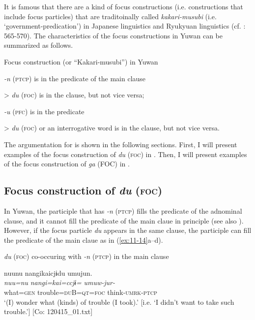 It is famous that there are a kind of focus constructions (i.e. constructions that include focus particles) that are traditoinally called \textit{kakari-musubi} (i.e. ‘government-predication’) in Japanese linguistics and Ryukyuan linguistics (cf. \citealt{Shimoji2008}: 565-570). The characteristics of the focus constructions in Yuwan can be summarized as follows.

\ea\label{ex:11-14}   Focus construction (or “Kakari-musubi”) in Yuwan

\ea   \textit{{}-n} (\textsc{ptcp}) is in the predicate of the main clause

> \textit{du} (\textsc{foc}) is in the clause, but not vice versa;

\ex   \textit{{}-u} (\textsc{pfc}) is in the predicate

> \textit{du} (\textsc{foc}) or an interrogative word is in the clause, but not vice versa.
\z
\z

The argumentation for  is shown in the following sections. First, I will present examples of the focus construction of \textit{du} (\textsc{foc}) in . Then, I will present examples of the focus construction of \textit{ga} (FOC) in .

\subsection{Focus construction of \textit{du} (\textsc{foc})}\label{sec:11.3.1}

In Yuwan, the participle that has \textit{{}-n} (\textsc{ptcp}) fills the predicate of the adnominal clause, and it cannot fill the predicate of the main claue in principle (see also ). However, if the focus particle \textit{du} appears in the same clause, the participle can fill the predicate of the main claue as in (\ref{ex:11-14}a--d).

\ea\label{ex:11-15}  \textit{du} (\textsc{foc}) co-occuring with \textit{{}-n} (\textsc{ptcp}) in the main clause

  \ea\relax[= (6-108 a)]

    
      \glll    nuunu  nangikaicjɨdu  umujun.\\
      \textit{nuu=nu}  \textit{nangi=kai=ccjɨ=}  \textit{umuw-jur-}\\
      what=\textsc{gen}  trouble=\textsc{du}B=\textsc{qt}=\textsc{foc}  think-\textsc{umrk}-\textsc{ptcp}\\
\glt       ‘(I) wonder what (kinds) of trouble (I took).’ [i.e. ‘I didn’t want to take such trouble.’] [Co: 120415\_01.txt]

